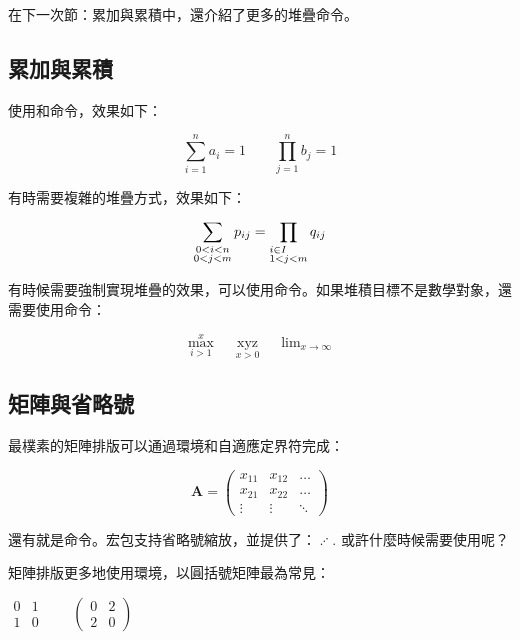 在下一次節：累加與累積中，還介紹了更多的堆疊命令。

\subsection{累加與累積}
使用和命令，效果如下：

\begin{codeshow}
\[\sum_{i=1}^{n}a_i=1 \qquad
\prod_{j=1}^{n}b_j=1\]
\end{codeshow}

有時需要複雜的堆疊方式，效果如下：

\begin{codeshow}
\[\sum_{\substack{0<i<n \\
  0<j<m}} p_{ij}=
  \prod_{\begin{subarray}{l}
  i\in I \\  1<j<m
  \end{subarray}}q_{ij}\]
\end{codeshow}

有時候需要強制實現堆疊的效果，可以使用命令。如果堆積目標不是數學對象，還需要使用命令：

\begin{codeshow}
\[\max\limits_{i>1}^{x}\quad
\mathop{xyz}\limits_{x>0}\quad
\lim\nolimits_{x\to \infty}\]
\end{codeshow}

\subsection{矩陣與省略號}
最樸素的矩陣排版可以通過環境和自適應定界符完成：

\begin{codeshow}
\[\mathbf{A}=
\left(\begin{array}{ccc}
x_{11} & x_{12} & \ldots \\
x_{21} & x_{22} & \ldots \\
\vdots & \vdots & \ddots
\end{array}\right)\]
\end{codeshow}

還有就是命令。宏包支持省略號縮放，並提供了：$\iddots$. 或許什麼時候需要使用呢？

矩陣排版更多地使用環境，以圓括號矩陣最為常見：
\begin{codeshow}
\centering $\begin{matrix}
0 & 1 \\ 1 & 0 \end{matrix}\qquad
\begin{pmatrix} 0 & 2 \\
2 & 0 \end{pmatrix}$
\end{codeshow}

